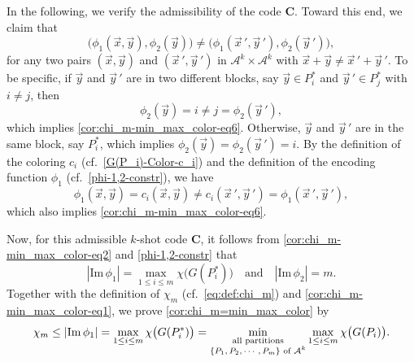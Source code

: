 \documentclass[11pt,draftclsnofoot,onecolumn]{IEEEtran}
\newcommand{\mbC}{\mathbf{C}}
\def\Im{\mathrm{Im}}
\begin{document}
In the following, we verify the admissibility of the code $\mbC$. Toward this end, we claim that
\begin{equation}
\big(\phi_{1}(\vec{x},\vec{y}), \phi_{2}(\vec{y})\big)\neq \big(\phi_{1}(\vec{x}\,',\vec{y}\,'),
\phi_{2}(\vec{y}\,')\big),\label{cor:chi_m-min_max_color-eq6}
\end{equation}
for any two pairs
$(\vec{x},\vec{y})$ and $(\vec{x}\,',\vec{y}\,')$ in $\mathcal{A}^k\times\mathcal{A}^k$ with $\vec{x}+\vec{y}\neq \vec{x}\,'+\vec{y}\,'$.
To be specific, if $\vec{y}$ and $\vec{y}\,'$ are in two different blocks, say $\vec{y}\in P_i^*$
and $\vec{y}\,'\in P_j^*$ with $i\neq j$, then
\begin{equation*}
\phi_2(\vec{y})=i\neq j=\phi_2(\vec{y}\,'),
\end{equation*}
which implies \eqref{cor:chi_m-min_max_color-eq6}. Otherwise, $\vec{y}$ and $\vec{y}\,'$ are in the same
block, say $P_i^*$, which implies
$\phi_2(\vec{y})=\phi_2(\vec{y}\,')=i$. By the definition of the coloring $c_i$ (cf.~\eqref{G(P_i)-Color-c_i}) and the definition of the encoding function $\phi_1$ (cf.~\eqref{phi-1,2-constr}), we have
\begin{equation*}
\phi_1(\vec{x},\vec{y})=c_i(\vec{x},\vec{y})\neq c_i(\vec{x}\,',\vec{y}\,')=\phi_1(\vec{x}\,',\vec{y}\,'),
\end{equation*}
which also implies \eqref{cor:chi_m-min_max_color-eq6}.

Now, for this admissible $k$-shot code $\mbC$, it follows from   \eqref{cor:chi_m-min_max_color-eq2} and \eqref{phi-1,2-constr} that
\begin{equation*}
|\Im\,\phi_1|=\max_{1\leq i\leq m}\chi\big(G(P^*_i)\big)\quad\text{and}\quad |\Im\,\phi_2|=m.
\end{equation*}
Together with the definition of $\chi_{m}$ (cf.~\eqref{eq:def:chi_m}) and \eqref{cor:chi_m-min_max_color-eq1}, we prove \eqref{cor:chi_m=min_max_color} by
\begin{equation*}
\chi_m\leq |\Im\,\phi_1|=\max_{1\leq i\leq m}\chi\big(G(P^*_i)\big)=\min_{\substack{\text{ \rm{all partitions} }\\\text{$\{P_1,P_2,\cdots,P_m\}$ \rm{of} $\mathcal{A}^{k}$}}}\max_{1\leq i\leq m}\chi\big(G(P_i)\big).\label{cor:chi_m<=min_max_color-5}
\end{equation*}
\end{document}

